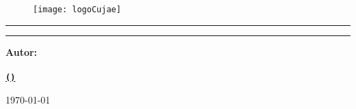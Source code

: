 \begin{titlepage}
	\centering %
	
	\begin{figure}[h]
		\centering
		\texttt{[image: logoCujae]} %
	\end{figure}
	
	{\LARGE \textbf{\university}\par}
	
	\vspace{0.4cm} %
	
	{\Large \faculty \par}
	
	\vspace{1cm} %
	
	\rule{\textwidth}{1pt} %
	
	\vspace{0.2cm} %
	
	{\Huge\bfseries \getTitle\par}
	
	\vspace{0.2cm} %
	
	\rule{\textwidth}{1pt} %
	
	\vspace{1.0cm} %
	
	{\Large\bfseries Autor: \\[0.3cm]
		\getAuthor \\[0.2cm]
		\href{mailto:\authorEmail}{\texttt{(\authorEmail)}}\par}
	
	\vspace{0.5cm} %
	\vspace{0.5cm} %
	
	{\large \today\par} %
	
	\vfill %
	
	\enlargethispage{0.5cm} %
\end{titlepage}